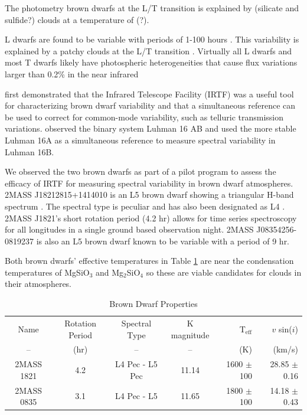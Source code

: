 \documentclass[twocolumn]{aastex6}
\begin{document}
The photometry brown dwarfs at the L/T transition is explained by (silicate and sulfide?) clouds at a temperature of (?).

L dwarfs are found to be variable with periods of 1-100 hours \citep{bailer-jones1999bdvar,bailer-jones1999varevo}.
This variability is explained by a patchy clouds at the L/T transition \citep{marley2010patchyc}.
Virtually all L dwarfs and most T dwarfs likely have photospheric heterogeneities that cause flux variations larger than 0.2\% in the near infrared \citep{metchev2015weatherII}

\citet{burgaser2014irtf} first demonstrated that the Infrared Telescope Facility (IRTF) was a useful tool for characterizing brown dwarf variability and that a simultaneous reference can be used to correct for common-mode variability, such as telluric transmission variations.
\citet{burgaser2014irtf} observed the binary system Luhman 16 AB and used the more stable Luhman 16A as a simultaneous reference to measure spectral variability in Luhman 16B.

We observed the two brown dwarfs as part of a pilot program to assess the efficacy of IRTF for measuring spectral variability in brown dwarf atmospheres.
2MASS J18212815+1414010 is an L5 brown dwarf showing a triangular H-band spectrum \citep{looper2008peculiarLdwarfs}.
The spectral type is peculiar and has also been designated as L4 \citep{gagne2015banyan7}.
2MASS J1821's short rotation period (4.2 hr) allows for time series spectroscopy for all longitudes in a single ground based observation night.
2MASS J08354256-0819237 \citep{cruz2003coolNeighbors} is also an L5 brown dwarf known to be variable with a period of 9 hr.

Both brown dwarfs' effective temperatures in Table \ref{tab:bdProp} are near the condensation temperatures of MgSiO$_3$ and Mg$_2$SiO$_4$ \citep{marley2015rev} so these are viable candidates for clouds in their atmospheres.

\begin{table}
\begin{center}
\caption{Brown Dwarf Properties}\label{tab:bdProp}
\begin{tabular}{ccccrr}
Name & Rotation Period & Spectral Type & K magnitude  & T$_\mathrm{eff}$ &  $v$ sin($i$) \\
-- & (hr) & -- & -- & (K) & (km/s) \\
\hline \hline
2MASS 1821 & 4.2\tablenotemark{a} & L4 Pec\tablenotemark{b} - L5 Pec\tablenotemark{c} & 11.14 & 1600 $\pm$ 100\tablenotemark{b} & 28.85 $\pm$ 0.16\tablenotemark{d}\\
2MASS 0835 & 3.1\tablenotemark{d} & L4 Pec\tablenotemark{b} - L5 & 11.65 & 1800 $\pm$ 100\tablenotemark{b} & 14.18 $\pm$ 0.43\tablenotemark{d} \\
\end{tabular}
\end{center}
\end{table}
\end{document}
